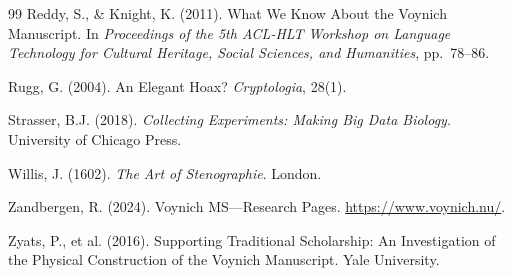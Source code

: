 \documentclass[11pt,a4paper,twocolumn]{article}
\begin{document}
\begin{thebibliography}{99}
 Reddy, S., \& Knight, K. (2011). What We Know About the Voynich Manuscript. In \textit{Proceedings of the 5th ACL-HLT Workshop on Language Technology for Cultural Heritage, Social Sciences, and Humanities}, pp.\ 78--86.

 Rugg, G. (2004). An Elegant Hoax? \textit{Cryptologia}, 28(1).

 Strasser, B.J. (2018). \textit{Collecting Experiments: Making Big Data Biology}. University of Chicago Press.

 Willis, J. (1602). \textit{The Art of Stenographie}. London.

 Zandbergen, R. (2024). Voynich MS---Research Pages. \url{https://www.voynich.nu/}.

 Zyats, P., et al. (2016). Supporting Traditional Scholarship: An Investigation of the Physical Construction of the Voynich Manuscript. Yale University.

\end{thebibliography}
\end{document}
